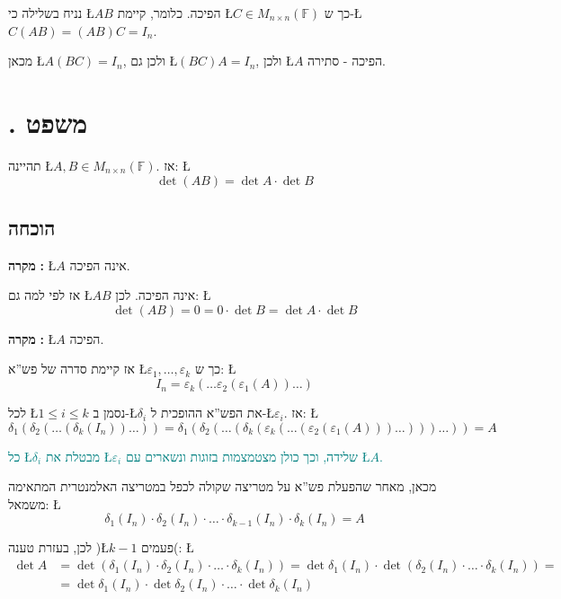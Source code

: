 \documentclass[english,hebrew]{article}
\begin{document}
נניח בשלילה כי \L{$AB$} הפיכה. כלומר, קיימת \L{$C\in M_{n\times n}(\mathbb{F})$}
כך ש-\L{$C(AB)=(AB)C=I_{n}$}.

מכאן \L{$A(BC)=I_{n}$}, ולכן גם \L{$(BC)A=I_{n}$}, ולכן \L{$A$}
הפיכה -  סתירה.

\section{{\endL}. משפט}

תהיינה \L{$A,B\in M_{n\times n}(\mathbb{F})$}. אז: \L{%
\[
\det(AB)=\det A\cdot\det B
\]
}%

\subsection{הוכחה}

\textbf{מקרה }\textbf{{}\endL}\textbf{:} \L{$A$} אינה הפיכה.

אז לפי למה {\endL} גם \L{$AB$} אינה הפיכה. לכן: \L{%
\[
\det(AB)=0=0\cdot\det B=\det A\cdot\det B
\]
}%

\textbf{מקרה }\textbf{{}\endL}\textbf{:} \L{$A$} הפיכה.

אז קיימת סדרה של פש\textquotedblright א \L{$\varepsilon_{1},\dots,\varepsilon_{k}$}
כך ש: \L{%
\[
I_{n}=\varepsilon_{k}(\dots\varepsilon_{2}(\varepsilon_{1}(A))\dots)
\]
}%

לכל \L{$1\le i\le k$} נסמן ב-\L{$\delta_{i}$} את הפש\textquotedblright א
ההופכית ל-\L{$\varepsilon_{i}$}. אז: \L{%
\[
\delta_{1}(\delta_{2}(\dots(\delta_{k}(I_{n}))\dots))=\delta_{1}(\delta_{2}(\dots(\delta_{k}(\varepsilon_{k}(\dots(\varepsilon_{2}(\varepsilon_{1}(A)))\dots)))\dots))=A
\]
}%

\textcolor{teal}{כל \L{$\delta_{i}$} מבטלת את \L{$\varepsilon_{i}$}
שלידה, וכך כולן מצטמצמות בזוגות ונשארים עם \L{$A$}.}

מכאן, מאחר שהפעלת פש\textquotedblright א על מטריצה שקולה לכפל במטריצה
האלמנטרית המתאימה משמאל: \L{%
\[
\delta_{1}(I_{n})\cdot\delta_{2}(I_{n})\cdot\dots\cdot\delta_{k-1}(I_{n})\cdot\delta_{k}(I_{n})=A
\]
}%

לכן, בעזרת טענה {\endL} )\L{$k-1$} פעמים(: \L{%
\begin{align*}
\det A & =\det\left(\delta_{1}(I_{n})\cdot\delta_{2}(I_{n})\cdot\dots\cdot\delta_{k}(I_{n})\right)=\det\delta_{1}(I_{n})\cdot\det\left(\delta_{2}(I_{n})\cdot\dots\cdot\delta_{k}(I_{n})\right)=\\
 & =\det\delta_{1}(I_{n})\cdot\det\delta_{2}(I_{n})\cdot\dots\cdot\det\delta_{k}(I_{n})
\end{align*}
}%
\end{document}
